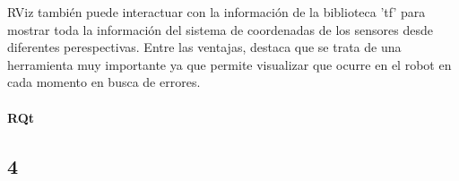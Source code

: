 RViz también puede interactuar con la información de la biblioteca 'tf' para
mostrar toda la información del sistema de coordenadas de los sensores desde
diferentes perespectivas. Entre las ventajas, destaca que se trata de una
herramienta muy importante ya que permite visualizar que ocurre en el robot en
cada momento en busca de errores.

\paragraph{RQt} \hspace{0pt}

\subsection{4}
